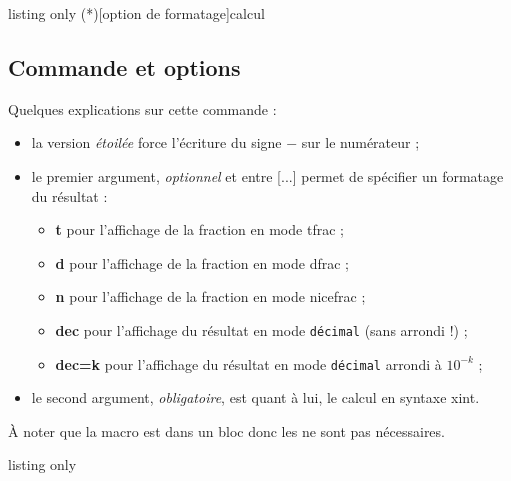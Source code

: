 \documentclass[a4paper,french,11pt]{article}
\newcommand\ctex[1]{\tcbox[vignettelatex]{#1}}
\newcommand\cmaj[1]{%
	{\tcbox[vignetteMaJ]{#1}\xspace}%
}
\newcommand\Cle[1]{{\bfseries\sffamily\textlangle #1\textrangle}}
\begin{document}
\begin{PresCodeTexPL}{listing only}
\ConversionFraction(*)[option de formatage]{calcul}
\end{PresCodeTexPL}

\subsection{Commande et options}

\begin{cautionblock}
Quelques explications sur cette commande :

\begin{itemize}
	\item \cmaj{2.5.1} la version \textit{étoilée} force l'écriture du signe \og $-$ \fg{} sur le numérateur ;
	\item le premier argument, \textit{optionnel} et entre \textsf{[...]} permet de spécifier un formatage du résultat :
	\begin{itemize}
		\item \Cle{t} pour l'affichage de la fraction en mode \textsf{tfrac} ;
		\item \Cle{d} pour l'affichage de la fraction en mode \textsf{dfrac} ;
		\item \Cle{n} pour l'affichage de la fraction en mode \textsf{nicefrac} ;
		\item \Cle{dec} pour l'affichage du résultat en mode \texttt{décimal} (sans arrondi !) ;
		\item \Cle{dec=k} pour l'affichage du résultat en mode \texttt{décimal} arrondi à $10^{-k}$ ;
	\end{itemize}
	\item le second argument, \textit{obligatoire}, est quant à lui, le calcul en syntaxe \textsf{xint}.
\end{itemize}

À noter que la macro est dans un bloc \ctex{ensuremath} donc les \ctex{\$...\$} ne sont pas nécessaires.
\end{cautionblock}

\begin{PresCodeTexPL}{listing only}
\end{PresCodeTexPL}
\end{document}
